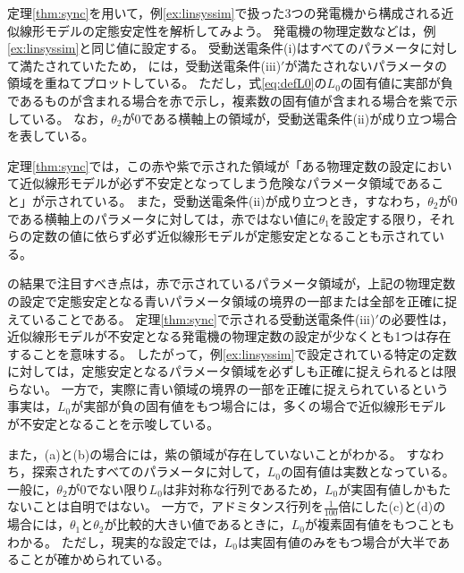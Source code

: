 \documentclass[tombow,dvipdfmx]{corona-a5-1.1}
\begin{document}
\begin{例}[受動送電条件に基づく定態安定性解析]\label{ex:linthm}
定理\ref{thm:sync}を用いて，例\ref{ex:linsyssim}で扱った3つの発電機から構成される近似線形モデルの定態安定性を解析してみよう。
発電機の物理定数などは，例\ref{ex:linsyssim}と同じ値に設定する。
受動送電条件(i)はすべてのパラメータに対して満たされていたため，
には，受動送電条件(iii)$'$が満たされないパラメータの領域を重ねてプロットしている。
ただし，式\ref{eq:defL0}の$L_0$の固有値に実部が負であるものが含まれる場合を赤で示し，複素数の固有値が含まれる場合を紫で示している。
なお，$\theta_2$が0である横軸上の領域が，受動送電条件(ii)が成り立つ場合を表している。

定理\ref{thm:sync}では，この赤や紫で示された領域が「ある物理定数の設定において近似線形モデルが必ず不安定となってしまう危険なパラメータ領域であること」が示されている。
また，受動送電条件(ii)が成り立つとき，すなわち，$\theta_2$が0である横軸上のパラメータに対しては，赤ではない値に$\theta_1$を設定する限り，それらの定数の値に依らず必ず近似線形モデルが定態安定となることも示されている。

の結果で注目すべき点は，赤で示されているパラメータ領域が，上記の物理定数の設定で定態安定となる青いパラメータ領域の境界の一部または全部を正確に捉えていることである。
定理\ref{thm:sync}で示される受動送電条件(iii)$'$の必要性は，近似線形モデルが不安定となる発電機の物理定数の設定が少なくとも1つは存在することを意味する。
したがって，例\ref{ex:linsyssim}で設定されている特定の定数に対しては，定態安定となるパラメータ領域を必ずしも正確に捉えられるとは限らない。
一方で，実際に青い領域の境界の一部を正確に捉えられているという事実は，$L_0$が実部が負の固有値をもつ場合には，多くの場合で近似線形モデルが不安定となることを示唆している。

また，(a)と(b)の場合には，紫の領域が存在していないことがわかる。
すなわち，探索されたすべてのパラメータに対して，$L_0$の固有値は実数となっている。
一般に，$\theta_2$が0でない限り$L_0$は非対称な行列であるため，$L_0$が実固有値しかもたないことは自明ではない。
一方で，アドミタンス行列を$\tfrac{1}{100}$倍にした(c)と(d)の場合には，$\theta_1$と$\theta_2$が比較的大きい値であるときに，$L_0$が複素固有値をもつこともわかる。
ただし，現実的な設定では，$L_0$は実固有値のみをもつ場合が大半であることが確かめられている。
\end{例}
\end{document}
